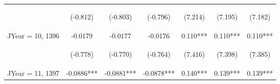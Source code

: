 \documentclass[]{article}
\begin{document}
\begin{center}
\begin{tabular}{lcccccc}
        \vspace{4pt}     & \begin{footnotesize}(-0.812)\end{footnotesize} & \begin{footnotesize}(-0.803)\end{footnotesize} & \begin{footnotesize}(-0.796)\end{footnotesize} & \begin{footnotesize}(7.214)\end{footnotesize}  & \begin{footnotesize}(7.195)\end{footnotesize}  & \begin{footnotesize}(7.182)\end{footnotesize}  \\
        JYear = 10, 1396 & -0.0179                                        & -0.0177                                        & -0.0176                                        & 0.110***                                       & 0.110***                                       & 0.110***                                       \\
        \vspace{4pt}     & \begin{footnotesize}(-0.778)\end{footnotesize} & \begin{footnotesize}(-0.770)\end{footnotesize} & \begin{footnotesize}(-0.764)\end{footnotesize} & \begin{footnotesize}(7.416)\end{footnotesize}  & \begin{footnotesize}(7.398)\end{footnotesize}  & \begin{footnotesize}(7.385)\end{footnotesize}  \\
        JYear = 11, 1397 & -0.0886***                                     & -0.0881***                                     & -0.0878***                                     & 0.140***                                       & 0.139***                                       & 0.139***                                       \\

\end{tabular}
\end{center}
\end{document}

